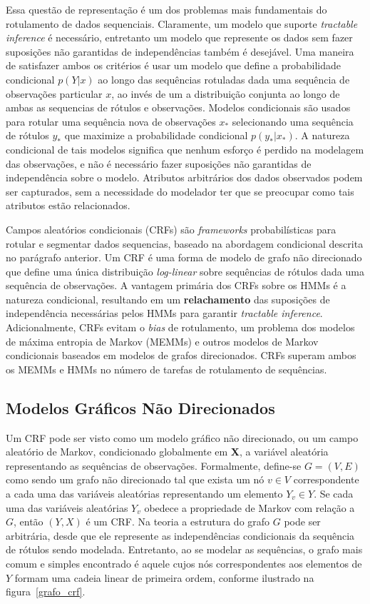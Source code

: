 Essa questão de representação é um dos problemas mais fundamentais do rotulamento de
dados sequenciais. Claramente, um modelo que suporte \textit{tractable inference} é
necessário, entretanto um modelo que represente os dados sem fazer suposições não
garantidas de independências também é desejável. Uma maneira de satisfazer ambos os
critérios é usar um modelo que define a probabilidade condicional $p(Y|x)$ ao longo
das sequências rotuladas dada uma sequência de observações particular $x$, ao invés de
um a distribuição conjunta ao longo de ambas as sequencias de rótulos e observações.
Modelos condicionais são usados para rotular uma sequência nova de observações $x_*$
selecionando uma sequência de rótulos $y_*$ que maximize a probabilidade condicional
$p(y_*|x_*)$. A natureza condicional de tais modelos significa que nenhum esforço é
perdido na modelagem das observações, e não é necessário fazer suposições não
garantidas de independência sobre o modelo. Atributos arbitrários dos dados observados
podem ser capturados, sem a necessidade do modelador ter que se preocupar como tais
atributos estão relacionados.

Campos aleatórios condicionais (CRFs) são \textit{frameworks} probabilísticas para
rotular e segmentar dados sequencias, baseado na abordagem condicional descrita no
parágrafo anterior. Um CRF é uma forma de modelo de grafo não direcionado que define
uma única distribuição \textit{log-linear} sobre sequências de rótulos dada uma
sequência de observações. A vantagem primária dos CRFs sobre os HMMs é a natureza
condicional, resultando em um \textbf{relachamento} das suposições de independência
necessárias pelos HMMs para garantir \textit{tractable inference}. Adicionalmente,
CRFs evitam o \textit{bias} de rotulamento, um problema dos modelos de máxima entropia
de Markov (MEMMs) e outros modelos de Markov condicionais baseados em modelos de grafos
direcionados. CRFs superam ambos os MEMMs e HMMs no número de tarefas de rotulamento de
sequências.

\subsection{Modelos Gráficos Não Direcionados}

Um CRF pode ser visto como um modelo gráfico não direcionado, ou um campo aleatório
de Markov, condicionado globalmente em \textbf{X}, a variável aleatória representando
as sequências de observações. Formalmente, define-se $G=(V,E)$ como sendo um
grafo não direcionado tal que exista um nó $v \in V$ correspondente a cada uma das
variáveis aleatórias representando um elemento $Y_v \in Y$. Se cada uma das variáveis
aleatórias $Y_v$ obedece a propriedade de Markov com relação a $G$, então $(Y,X)$ é
um CRF\@. Na teoria a estrutura do grafo $G$ pode ser arbitrária, desde que ele represente
as independências condicionais da sequência de rótulos sendo modelada. Entretanto,
ao se modelar as sequências, o grafo mais comum e simples encontrado é aquele cujos nós
correspondentes aos elementos de $Y$ formam uma cadeia linear de primeira ordem, conforme
ilustrado na figura~\ref{grafo_crf}.

